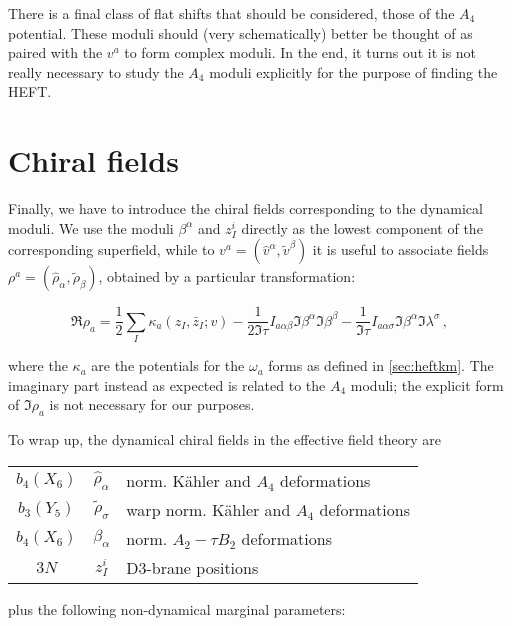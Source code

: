 There is a final class of flat shifts that should be considered, those of the $A_4$ potential. These moduli should (very schematically) better be thought of as paired with the $v^a$ to form complex moduli. In the end, it turns out it is not really necessary to study the $A_4$ moduli explicitly for the purpose of finding the HEFT.


\section{Chiral fields}\label{sec:heftchiral}

Finally, we have to introduce the chiral fields corresponding to the dynamical moduli. We use the moduli $\beta^\alpha$ and $z_I^i$ directly as the lowest component of the corresponding superfield, while to $v^a = (\hat v^\alpha,\tilde v^\beta)$ it is useful to associate fields $\rho^a = (\hat \rho_\alpha, \tilde \rho_\beta)$, obtained by a particular transformation:

\begin{equation}
	\Re{\rho_a} = \frac{1}{2}\sum_I \kappa_a(z_I, \bar z_I ; v) - \frac{1}{2 \Im \tau} I_{a\alpha\beta} \Im \beta^\alpha \Im \beta^\beta - \frac{1}{\Im \tau} I_{a\alpha\sigma} \Im \beta^\alpha \Im \lambda^\sigma\,,
	\label{rhov}
\end{equation}

where the $\kappa_a$ are the potentials for the $\omega_a$ forms as defined in \ref{sec:heftkm}. The imaginary part instead as expected is related to the $A_4$ moduli; the explicit form of $\Im \rho_a$ is not necessary for our purposes.

To wrap up, the dynamical chiral fields in the effective field theory are


\begin{center}
\begin{tabular}{|c | c | l |}
	\hline
	$b_4(X_6)$	& $\hat\rho_\alpha$	& norm. K\"ahler and $A_4$ deformations\\
	$b_3(Y_5)$	& $\tilde\rho_\sigma$	& warp norm. K\"ahler and $A_4$ deformations\\
	$b_4(X_6)$	& $\beta_\alpha$	& norm. $A_2 - \tau B_2$ deformations\\
	$3N$ 		& $z_I^i$		& D3-brane positions\\
	\hline
\end{tabular}
\end{center}

plus the following non-dynamical marginal parameters:\\

